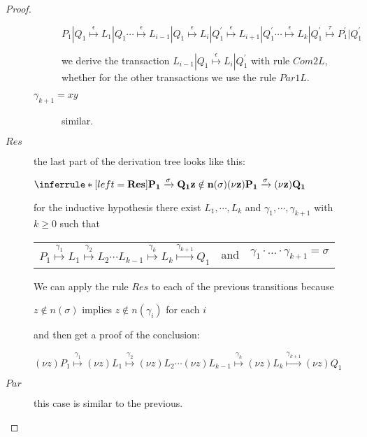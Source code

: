 \begin{proposition}
\begin{proof}
\begin{description}
\begin{description}
	    \begin{center}
	      $
		  P_{1}|Q_{1} \stackrel{\epsilon}{\longmapsto} L_{1}|Q_{1} 
		  \cdots
			      \stackrel{\epsilon}{\longmapsto} L_{i-1}|Q_{1} 
			      \stackrel{\epsilon}{\longmapsto} L_{i}|Q_{1}^{'}
			      \stackrel{\epsilon}{\longmapsto} L_{i+1}|Q_{1}^{'}
		  \cdots 
			      \stackrel{\epsilon}{\longmapsto} L_{k}|Q_{1}^{'}
			      \stackrel{\tau}{\longmapsto} P_{1}^{'}|Q_{1}^{'}$	  
	    \end{center}
	    we derive the transaction $ L_{i-1}|Q_{1} \stackrel{\epsilon}{\longmapsto} L_{i}|Q_{1}^{'}$ with rule $Com2L$, whether for the other transactions  we use the rule $Par1L$.
	  \item[$\gamma_{k+1}=xy$] similar.
	\end{description}
      \item[$Res$]
	the last part of the derivation tree looks like this:
	\begin{center}
	  $\inferrule* [left=\bf{Res}]{
	      P_{1} \xrightarrow{\sigma} Q_{1}
	    \\
	      z\notin n(\sigma)
	  }{
	    (\nu z) P_{1} \xrightarrow{\sigma} (\nu z) Q_{1}
	  }$
	\end{center}
	for the inductive hypothesis there exist $L_{1}, \cdots, L_{k}$ and $\gamma_{1}, \cdots, \gamma_{k+1}$ with $k\geq 0$ such that 
	\begin{center}
	  \begin{tabular}{lll}
	    $P_{1} \stackrel{\gamma_{1}}{\longmapsto} L_{1}  \stackrel{\gamma_{2}}{\longmapsto} L_{2} \cdots L_{k-1} \stackrel{\gamma_{k}}{\longmapsto} L_{k} \stackrel{\gamma_{k+1}}{\longmapsto} Q_{1}$ 
	  &
	    and
	  &
	    $\gamma_{1} \cdot \ldots \cdot \gamma_{k+1} =  \sigma$
	  \end{tabular}
	\end{center}
	We can apply the rule $Res$ to each of the previous transitions because 
	\begin{center}
	  $z\notin n(\sigma)$ implies $z\notin n(\gamma_{i})$ for each $i$
	\end{center}
	and then get a proof of the conclusion:
	\begin{center}
	  $(\nu z)P_{1} \stackrel{\gamma_{1}}{\longmapsto} (\nu z)L_{1}  \stackrel{\gamma_{2}}{\longmapsto} (\nu z)L_{2} \cdots (\nu z)L_{k-1} \stackrel{\gamma_{k}}{\longmapsto} (\nu z)L_{k} \stackrel{\gamma_{k+1}}{\longmapsto} (\nu z)Q_{1}$
	\end{center}
      \item[$Par$] this case is similar to the previous.

\end{description}
\end{proof}
\end{proposition}
